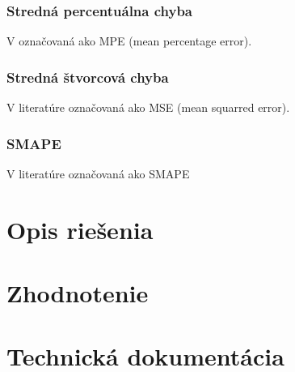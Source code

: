 \documentclass[a4paper,slovak,12pt,appendix]{article}
\begin{document}
\subsubsection{Stredná percentuálna chyba}
V označovaná ako MPE (mean percentage error).

\subsubsection{Stredná štvorcová chyba}
V literatúre označovaná ako MSE (mean squarred error).

\subsubsection{SMAPE}
V literatúre označovaná ako SMAPE



\newpage
\section{Opis riešenia}


\newpage
\section{Zhodnotenie}


\newpage
\section{Technická dokumentácia}





\newpage


\end{document}
